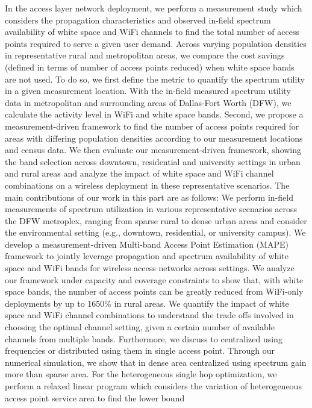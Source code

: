 In the access layer network deployment, we perform a measurement study which considers 
the propagation characteristics and observed in-field spectrum availability of white 
space and WiFi channels to find the total number of access points required to serve a 
given user demand. Across varying population densities in representative rural and 
metropolitan areas, we compare the cost savings (defined in terms of number of access 
points reduced) when white space bands are not used. To do so, we first define the 
metric to quantify the spectrum utility in a given measurement location. With the 
in-field measured spectrum utility data in metropolitan and surrounding areas of 
Dallas-Fort Worth (DFW), we calculate the activity level in WiFi and white space 
bands. Second, we propose a measurement-driven framework to find the number of 
access points required for areas with differing population densities according to 
our measurement locations and census data. We then evaluate our measurement-driven 
framework, showing the band selection across downtown, residential and university settings 
in urban and rural areas and analyze the impact of white space and WiFi channel combinations 
on a wireless deployment in these representative scenarios. 
The main contributions of our work in this part are as follows: We perform in-field 
measurements of spectrum utilization in various representative scenarios across the 
DFW metroplex, ranging from sparse rural to dense urban areas and consider the 
environmental setting (e.g., downtown, residential, or university campus). We 
develop a measurement-driven Multi-band Access Point Estimation (MAPE) framework to 
jointly leverage propagation and spectrum availability of white space and WiFi bands 
for wireless access networks across settings. We analyze our framework under capacity and 
coverage constraints to show that, with white space bands, the number of access points 
can be greatly reduced from WiFi-only deployments by up to 1650\% in rural areas. We 
quantify the impact of white space and WiFi channel combinations to understand the 
trade offs involved in choosing the optimal channel setting, given a certain number of 
available channels from multiple bands. Furthermore, we discuss to centralized using 
frequencies or distributed using them in single access point. Through our numerical 
simulation, we show that in dense area centralized using spectrum gain more than sparse 
area.
For the heterogeneous single hop optimization, we perform a relaxed linear program which 
considers the variation of heterogeneous access point service area to find the lower bound 
